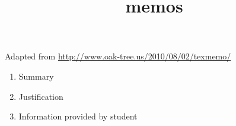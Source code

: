 \documentclass[letter,12pt]{texMemo}
\date{}
\title{memos}
\begin{document}
Adapted from \url{http://www.oak-tree.us/2010/08/02/texmemo/}

\maketitle


\begin{enumerate}
\item Summary
\label{sec-1}
\item Justification
\label{sec-2}
\item Information provided by student
\label{sec-3}
\end{enumerate}
\end{document}
